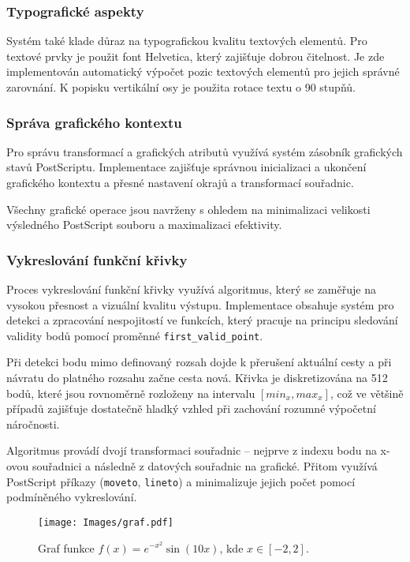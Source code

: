\documentclass[12pt]{article} %
\begin{document}
\subsubsection{Typografické aspekty}

Systém také klade důraz na typografickou kvalitu textových elementů. Pro textové prvky je použit font Helvetica, který zajišťuje dobrou čitelnost. Je zde implementován automatický výpočet pozic textových elementů pro jejich správné zarovnání. K popisku vertikální osy je použita rotace textu o 90 stupňů.


\subsubsection{Správa grafického kontextu}

Pro správu transformací a grafických atributů využívá systém zásobník grafických stavů PostScriptu. Implementace zajišťuje správnou inicializaci a ukončení grafického kontextu a přesné nastavení okrajů a transformací souřadnic.

Všechny grafické operace jsou navrženy s ohledem na minimalizaci velikosti výsledného PostScript souboru a maximalizaci efektivity.

\subsubsection{Vykreslování funkční křivky}
Proces vykreslování funkční křivky využívá algoritmus, který se zaměřuje na vysokou přesnost a vizuální kvalitu výstupu. Implementace obsahuje systém pro detekci a zpracování nespojitostí ve funkcích, který pracuje na principu sledování validity bodů pomocí proměnné \texttt{first\_valid\_point}. 

Při detekci bodu mimo definovaný rozsah dojde k přerušení aktuální cesty a při návratu do platného rozsahu začne cesta nová. Křivka je diskretizována na 512 bodů, které jsou rovnoměrně rozloženy na intervalu $[min_x, max_x]$, což ve většině případů zajišťuje dostatečně hladký vzhled při zachování rozumné výpočetní náročnosti.

Algoritmus provádí dvojí transformaci souřadnic -- nejprve z indexu bodu na x-ovou souřadnici a následně z datových souřadnic na grafické. Přitom využívá PostScript příkazy (\texttt{moveto}, \texttt{lineto}) a minimalizuje jejich počet pomocí podmíněného vykreslování.

\begin{figure}[H]
    \centering
    \texttt{[image: Images/graf.pdf]} %
    \caption{Graf funkce $f(x) = e^{-x^2} \sin(10x)$, kde $x \in [-2,2]$.}
    \label{fig:example-graph}
\end{figure}
\end{document}
